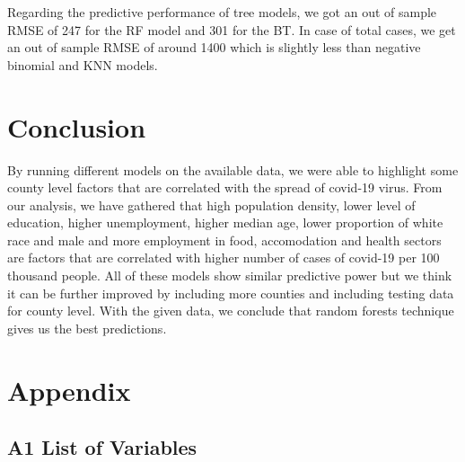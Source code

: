 \documentclass[
]{article}
\begin{document}
Regarding the predictive performance of tree models, we got an out of
sample RMSE of 247 for the RF model and 301 for the BT. In case of total
cases, we get an out of sample RMSE of around 1400 which is slightly
less than negative binomial and KNN models.

\hypertarget{conclusion}{%
\section{Conclusion}\label{conclusion}}

By running different models on the available data, we were able to
highlight some county level factors that are correlated with the spread
of covid-19 virus. From our analysis, we have gathered that high
population density, lower level of education, higher unemployment,
higher median age, lower proportion of white race and male and more
employment in food, accomodation and health sectors are factors that are
correlated with higher number of cases of covid-19 per 100 thousand
people. All of these models show similar predictive power but we think
it can be further improved by including more counties and including
testing data for county level. With the given data, we conclude that
random forests technique gives us the best predictions.

\newpage

\hypertarget{appendix}{%
\section{Appendix}\label{appendix}}

\hypertarget{a1-list-of-variables}{%
\subsection{A1 List of Variables}\label{a1-list-of-variables}}
\end{document}
